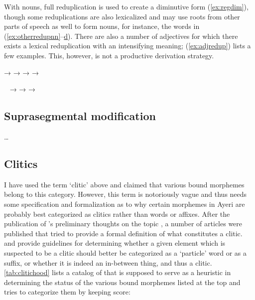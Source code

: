 With nouns, full reduplication is used to create a diminutive 
form (\ref{ex:regdim}), though some reduplications are also lexicalized and 
may use roots from other parts of speech as well to form nouns, for instance, 
the words in (\ref{ex:otherredupnn}--\hyperref[ex:otherredupvb]{d}). There are 
also a number of adjectives for which there exists a lexical reduplication with 
an intensifying meaning; (\ref{ex:adjredup}) lists a few examples. This, 
however, is not a productive derivation strategy.

\pex
	\a {} →  \label{ex:regdim}
	\a {} →  
		\label{ex:otherredupnn}
	\a {} → 
		 \label{ex:otherredupadj}
	\a {} →  
		\label{ex:otherredupvb}
\xe

\pex~\label{ex:adjredup}
	\a {} → 
	\a {} → 
	\a {} → 
\xe

\subsection{Suprasegmental modification}

…

\subsection{Clitics}

I have used the term `clitic' above and claimed that various bound morphemes 
belong to this category. However, this term is notoriously vague and thus needs 
some specification and formalization as to why certain morphemes in Ayeri are 
probably best categorized as clitics rather than words or affixes. After the 
publication of \citeauthor{zwicky1977}'s preliminary thoughts on the topic 
\citep{zwicky1977}, a number of articles were published that tried to provide a 
formal definition of what constitutes a clitic. \citet{zwicky1985} and 
\citet{klavans1985} provide guidelines for determining whether a given element 
which is suspected to be a clitic should better be categorized as a `particle' 
word or as a suffix, or whether it is indeed an in-between thing, and thus a 
clitic. \autoref{tab:clitichood} lists a catalog of 
 that is supposed to serve as a 
heuristic in determining the status of the various bound morphemes listed at 
the top and tries to categorize them by keeping score:

